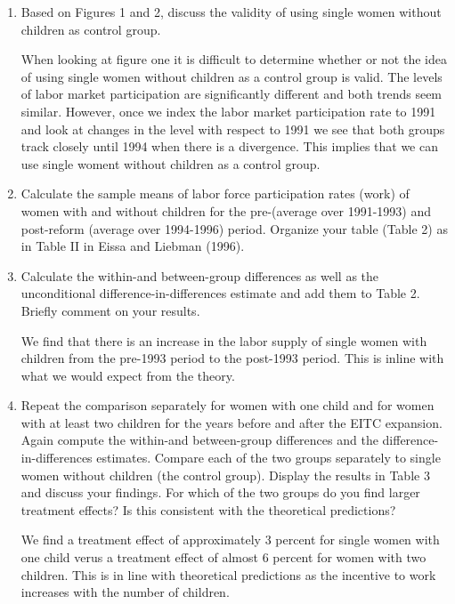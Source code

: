 \documentclass{article}
\begin{document}
\begin{enumerate}[label=\alph*]
\item  Based on Figures 1 and 2, discuss the validity of using single women without children as control group.

When looking at figure one it is difficult to determine whether or not the idea of using single women without children as a control group is valid.  The levels of labor market participation are significantly different and both trends seem similar.  However, once we index the labor market participation rate to 1991 and look at changes in the level with respect to 1991 we see that both groups track closely until 1994 when there is a divergence.  This implies that we can use single woment without children as a control group.

\item Calculate the sample means of labor force participation rates (work) of women with and without children for the pre-(average over 1991-1993) and post-reform (average over 1994-1996) period. Organize your table (Table 2) as in Table II in Eissa and Liebman (1996).

\item Calculate the within-and between-group differences as well as the unconditional difference-in-differences estimate and add them to Table 2. Briefly comment on your results.


We find that there is an increase in the labor supply of single women with children from the pre-1993 period to the post-1993 period.  This is inline with what we would expect from the theory.

\item  Repeat the comparison separately for women with one child and for women with at least two children for the years before and after the EITC expansion. Again compute the within-and between-group differences and the difference-in-differences estimates. Compare each of the two groups separately to single women without children (the control group). Display the results in Table 3 and discuss your findings. For which of the two groups do you find larger treatment effects? Is this consistent with the theoretical predictions?

We find a treatment effect of approximately 3 percent for single women with one child verus a treatment effect of almost 6 percent for women with two children.  This is in line with theoretical predictions as the incentive to work increases with the number of children.




\end{enumerate}
\end{document}
